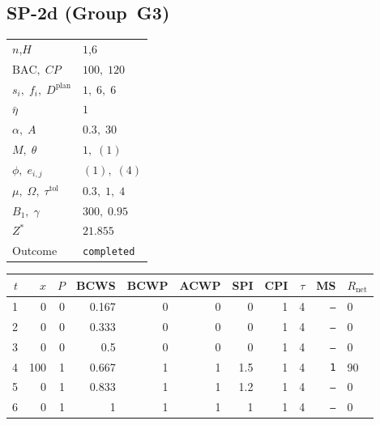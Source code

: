 \documentclass[12pt, a4paper]{article}
\newcommand{\BAC}{\mathrm{BAC}}
\begin{document}
\newpage

\subsection*{SP-2d  (Group~G3)}
\begin{center}
\begin{tabular}{ll}
\toprule
$n$,\;$H$ & $1$,\;$6$ \\
$\BAC,\;CP$ & $100,\;120$ \\
$s_i,\;f_i,\;D^{\mathrm{plan}}$ & $1,\;6,\;6$ \\
$\bar\eta$ & $1$ \\
$\alpha,\;A$ & $0.3,\;30$ \\
$M,\;\theta$ & $1,\;(1)$ \\
$\phi,\;e_{i,j}$ & $(1),\;(4)$ \\
$\mu,\;\Omega,\;\tau^{\mathrm{tol}}$ & $0.3,\;1,\;4$ \\
$B_1,\;\gamma$ & $300,\;0.95$ \\
$Z^*$ & $21.855$ \\
Outcome & \texttt{completed} \\
\bottomrule
\end{tabular}
\end{center}

\begin{center}
\begin{tabular}{rrrrrrrrrrl}
\toprule
$t$ & $x$ & $P$ & BCWS & BCWP & ACWP & SPI & CPI & $\tau$ & MS & $R_{\mathrm{net}}$\\
\midrule
1 & 0 & 0 & 0.167 & 0 & 0 & 0 & 1 & 4 & \texttt{---} & 0 \\
2 & 0 & 0 & 0.333 & 0 & 0 & 0 & 1 & 4 & \texttt{---} & 0 \\
3 & 0 & 0 & 0.5 & 0 & 0 & 0 & 1 & 4 & \texttt{---} & 0 \\
4 & 100 & 1 & 0.667 & 1 & 1 & 1.5 & 1 & 4 & \texttt{1} & 90 \\
5 & 0 & 1 & 0.833 & 1 & 1 & 1.2 & 1 & 4 & \texttt{---} & 0 \\
6 & 0 & 1 & 1 & 1 & 1 & 1 & 1 & 4 & \texttt{---} & 0 \\
\bottomrule
\end{tabular}
\end{center}
\end{document}
